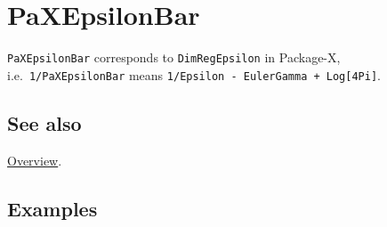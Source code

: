 \documentclass[../FeynHelpersManual.tex]{subfiles}
\begin{document}
\hypertarget{paxepsilonbar}{
\section{PaXEpsilonBar}\label{paxepsilonbar}}

\texttt{PaXEpsilonBar} corresponds to \texttt{DimRegEpsilon} in
Package-X, i.e.~\texttt{1/PaXEpsilonBar} means
\texttt{1/Epsilon - EulerGamma + Log[\allowbreak{}4Pi]}.

\subsection{See also}

\hyperlink{toc}{Overview}.

\subsection{Examples}
\end{document}
